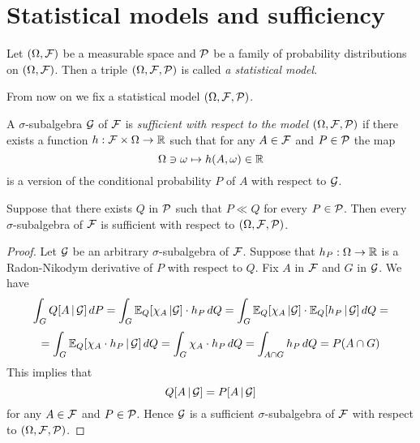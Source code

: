 \section{Statistical models and sufficiency}

\begin{definition}
Let $(\Omega, {\mathcal F})$ be a measurable space and ${\mathcal P}$ be a family of probability distributions on $(\Omega, {\mathcal F})$. Then a triple $(\Omega, {\mathcal F}, {\mathcal P})$ is called \textit{a statistical model}.
\end{definition}
\noindent
From now on we fix a statistical model $(\Omega, {\mathcal F}, {\mathcal P})$.

\begin{definition}
A $\sigma$-subalgebra ${\mathcal G}$ of ${\mathcal F}$ is \textit{sufficient with respect to the model $(\Omega, {\mathcal F}, {\mathcal P})$} if there exists a function $h:{\mathcal F} \times \Omega \rightarrow {\mathbb R}$ such that for any $A\in {\mathcal F}$ and $P \in {\mathcal P}$ the map
$$\Omega \ni \omega \mapsto h(A, \omega)\in {\mathbb R}$$
is a version of the conditional probability $P$ of $A$ with respect to ${\mathcal G}$.
\end{definition}

\begin{proposition}
Suppose that there exists $Q$ in ${\mathcal P}$ such that $P \ll Q$ for every $P\in {\mathcal P}$. Then every $\sigma$-subalgebra of ${\mathcal F}$ is sufficient with respect to $(\Omega, {\mathcal F}, {\mathcal P})$.
\end{proposition}
\begin{proof}
Let ${\mathcal G}$ be an arbitrary $\sigma$-subalgebra of ${\mathcal F}$. Suppose that $h_{P}:\Omega \rightarrow {\mathbb R}$ is a Radon-Nikodym derivative of $P$ with respect to $Q$. Fix $A$ in ${\mathcal F}$ and $G$ in ${\mathcal G}$. We have
$$\int_GQ[A\,|\,{\mathcal G}]\,dP = \int_G\mathbb{E}_{Q}[\chi_A\,|{\mathcal G}]\cdot h_{P}\,dQ = \int_G \mathbb{E}_{Q}[\chi_A\,|{\mathcal G}]\cdot \mathbb{E}_{Q}[h_{P}\,|\,{\mathcal G}]\,dQ =$$
$$=\int_G\mathbb{E}_{Q}[\chi_A\cdot h_{P}\,|\,{\mathcal G}]\,dQ= \int_G\chi_A\cdot h_{P}\,dQ = \int_{A\cap G}h_{P}\,dQ=P(A\cap G)$$
This implies that 
$$Q[A\,|\,{\mathcal G}] = P[A\,|\,{\mathcal G}]$$
for any $A\in {\mathcal F}$ and $P\in {\mathcal P}$. Hence ${\mathcal G}$ is a sufficient $\sigma$-subalgebra of ${\mathcal F}$ with respect to $(\Omega, {\mathcal F}, {\mathcal P})$.
\end{proof}


